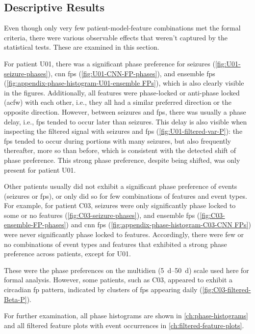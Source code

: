 \subsection{Descriptive Results} \label{subsec:descriptive-results}
Even though only very few patient-model-feature combinations met the formal criteria, there were various observable effects that weren't captured by the statistical tests.
These are examined in this section.

For patient U01, there was a significant phase preference for seizures (\cref{fig:U01-seizure-phases}), \gls{cnn} \glspl{fp} (\cref{fig:U01-CNN-FP-phases}), and ensemble \glspl{fp} (\cref{fig:appendix-phase-histogram-U01-ensemble FPs}), which is also clearly visible in the figures.
Additionally, all features were phase-locked or anti-phase locked (\gls{acfw}) with each other, i.e., they all had a similar preferred direction or the opposite direction.
However, between seizures and \glspl{fp}, there was usually a phase delay, i.e., \glspl{fp} tended to occur later than seizures.
This delay is also visible when inspecting the filtered signal with seizures and \glspl{fp} (\cref{fig:U01-filtered-var-P}): the \glspl{fp} tended to occur during portions with many seizures, but also frequently thereafter, more so than before, which is consistent with the detected shift of phase preference.
This strong phase preference, despite being shifted, was only present for patient U01.

Other patients usually did not exhibit a significant phase preference of events (seizures or \glspl{fp}), or only did so for few combinations of features and event types.
For example, for patient C03, seizures were only significantly phase locked to some or no features (\cref{fig:C03-seizure-phases}), and ensemble \glspl{fp} (\cref{fig:C03-ensemble-FP-phases}) and \gls{cnn} \glspl{fp} (\cref{fig:appendix-phase-histogram-C03-CNN FPs}) were never significantly phase locked to features.
Accordingly, there were few or no combinations of event types and features that exhibited a strong phase preference across patients, except for U01.

These were the phase preferences on the multidien (\SIrange{5}{50}{\day}) scale used here for formal analysis.
However, some patients, such as C03, appeared to exhibit a circadian \gls{fp} pattern, indicated by clusters of \glspl{fp} appearing daily (\cref{fig:C03-filtered-Beta-P}).

For further examination, all phase histograms are shown in \cref{ch:phase-histograms} and all filtered feature plots with event occurrences in \cref{ch:filtered-feature-plots}.

